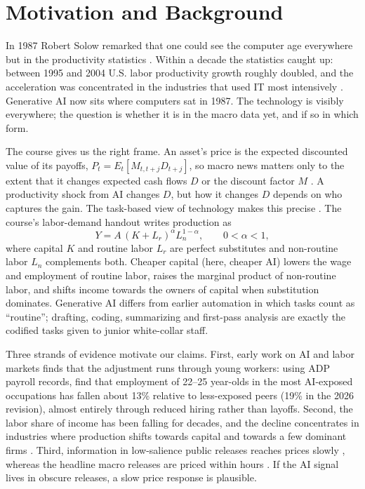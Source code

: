 \section{Motivation and Background}
\label{sec:motivation}

In 1987 Robert Solow remarked that one could see the computer age everywhere but in the productivity statistics \citep{solow1987}. Within a decade the statistics caught up: between 1995 and 2004 U.S. labor productivity growth roughly doubled, and the acceleration was concentrated in the industries that used IT most intensively \citep{stiroh2002it}. Generative AI now sits where computers sat in 1987. The technology is visibly everywhere; the question is whether it is in the macro data yet, and if so in which form.

The course gives us the right frame. An asset's price is the expected discounted value of its payoffs, $P_t = E_t\left[M_{t,t+j} D_{t+j}\right]$, so macro news matters only to the extent that it changes expected cash flows $D$ or the discount factor $M$ \citep{zetlinjones2026notes}. A productivity shock from AI changes $D$, but how it changes $D$ depends on who captures the gain. The task-based view of technology makes this precise \citep{autor2003skill, acemoglu2019automation}. The course's labor-demand handout writes production as
\begin{equation}
  Y = A\,(K + L_r)^{\alpha} L_n^{1-\alpha}, \qquad 0<\alpha<1,
  \label{eq:tasks}
\end{equation}
where capital $K$ and routine labor $L_r$ are perfect substitutes and non-routine labor $L_n$ complements both. Cheaper capital (here, cheaper AI) lowers the wage and employment of routine labor, raises the marginal product of non-routine labor, and shifts income towards the owners of capital when substitution dominates. Generative AI differs from earlier automation in which tasks count as ``routine''; drafting, coding, summarizing and first-pass analysis are exactly the codified tasks given to junior white-collar staff.

Three strands of evidence motivate our claims. First, early work on AI and labor markets finds that the adjustment runs through young workers: using ADP payroll records, \citet{brynjolfsson2025canaries} find that employment of 22--25 year-olds in the most AI-exposed occupations has fallen about 13\% relative to less-exposed peers (19\% in the 2026 revision), almost entirely through reduced hiring rather than layoffs. Second, the labor share of income has been falling for decades, and the decline concentrates in industries where production shifts towards capital and towards a few dominant firms \citep{karabarbounis2014labor, autor2020superstar}. Third, information in low-salience public releases reaches prices slowly \citep{hou2007industry, dellavigna2009inattention}, whereas the headline macro releases are priced within hours \citep{ai2018risk, lucca2015prefomc}. If the AI signal lives in obscure releases, a slow price response is plausible.

